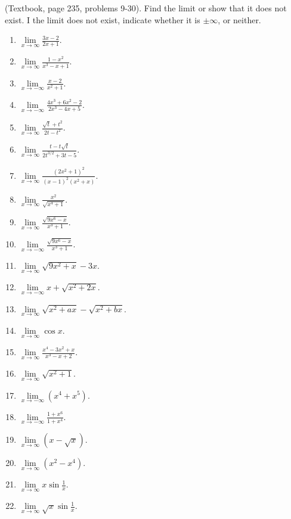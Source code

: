 \begin{problem} (Textbook, page 235, problems 9-30).
Find the limit or show that it does not exist. I the limit does not exist, indicate whether it is $\pm\infty$, or neither. 
\begin{multicols}{3}
\begin{enumerate}
\item $\lim\limits_{x\to\infty }\frac{3x-2}{2x+1}$.
\item $\lim\limits_{x\to\infty }\frac{1-x^2}{x^3-x+1}$.
\item $\lim\limits_{x\to-\infty }\frac{x-2}{x^2+1}$.
\item $\lim\limits_{x\to-\infty }\frac{4x^3+6x^2-2}{2x^3-4x+5}$.
\item $\lim\limits_{x\to\infty }\frac{\sqrt{t}+t^2}{2t-t^2}$.
\item $\lim\limits_{x\to\infty }\frac{t-t\sqrt{t}}{2t^{3/2}+3t-5}$.
\item $\lim\limits_{x\to\infty }\frac{(2x^2+1)^2}{(x-1)^2(x^2+x)}$.
\item $\lim\limits_{x\to\infty }\frac{x^2}{\sqrt{x^4+1}}$.
\item $\lim\limits_{x\to\infty }\frac{\sqrt{9x^6-x}}{x^3+1}$.
\item $\lim\limits_{x\to-\infty }\frac{\sqrt{9x^6-x}}{x^3+1}$.
\item $\lim\limits_{x\to\infty}\sqrt{9x^2+x}-3x$.
\item $\lim\limits_{x\to-\infty}x+\sqrt{x^2+2x} $.
\item $\lim\limits_{x\to\infty}\sqrt{x^2+ax}-\sqrt{x^2+bx}$.
\item $\lim\limits_{x\to\infty}\cos x$.
\item $\lim\limits_{x\to\infty}\frac{x^4-3x^2+x}{x^3-x+2}$.
\item $\lim\limits_{x\to\infty}\sqrt{x^2+1}$.
\item $\lim\limits_{x\to-\infty}(x^4+x^5)$.
\item $\lim\limits_{x\to-\infty}\frac{1+x^6}{1+x^4}$.
\item $\lim\limits_{x\to\infty}(x-\sqrt{x})$.
\item $\lim\limits_{x\to\infty}(x^2-x^4)$.
\item $\lim\limits_{x\to\infty}x\sin \frac{1}{x}$.
\item $\lim\limits_{x\to\infty}\sqrt{x}\sin \frac{1}{x}$.
\end{enumerate}
\end{multicols}
\end{problem}